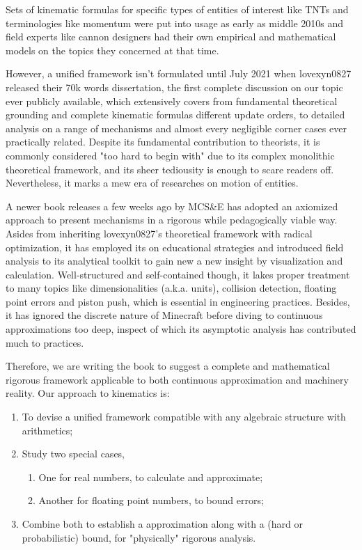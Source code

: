 \documentclass{book}
\theoremstyle{definition}\newtheorem{mechanism}{Mechanism}
\theoremstyle{remark}\newtheorem*{remark}{Remark}
\begin{document}
Sets of kinematic formulas for specific types of entities of interest like TNTs and terminologies like momentum were put into usage as early as middle 2010s and field experts like cannon designers had their own empirical and mathematical models on the topics they concerned at that time.

However, a unified framework isn't formulated until July 2021 when lovexyn0827 released their 70k words dissertation\cite{2021}, the first complete discussion on our topic ever publicly available, which extensively covers from fundamental theoretical grounding and complete kinematic formulas different update orders, to detailed analysis on a range of mechanisms and almost every negligible corner cases ever practically related. Despite its fundamental contribution to theorists, it is commonly considered "too hard to begin with" due to its complex monolithic theoretical framework, and its sheer tediousity is enough to scare readers off. Nevertheless, it marks a mew era of researches on motion of entities.

A newer book \cite{MCSE} releases a few weeks ago by MCS\&E has adopted an axiomized approach to present mechanisms in a rigorous while pedagogically viable way. Asides from inheriting lovexyn0827's theoretical framework with radical optimization, it has employed its on educational strategies and introduced field analysis to its analytical toolkit to gain new a new insight by visualization and calculation. Well-structured and self-contained though, it lakes proper treatment to many topics like dimensionalities (a.k.a. units), collision detection, floating point errors and piston push, which is essential in engineering practices. Besides, it has ignored the discrete nature of Minecraft before diving to continuous approximations too deep, inspect of which its asymptotic analysis has contributed much to practices.

Therefore, we are writing the book to suggest a complete and mathematical rigorous framework applicable to both continuous approximation and machinery reality. Our approach to kinematics is:

\begin{enumerate}
	\item To devise a unified framework compatible with any algebraic structure with arithmetics;
	\item Study two special cases,
	\begin{enumerate}
		\item One for real numbers, to calculate and approximate;
		\item Another for floating point numbers, to bound errors;
	\end{enumerate}
	\item Combine both to establish a approximation along with a (hard or probabilistic) bound, for "physically" rigorous analysis.
\end{enumerate}
\end{document}
